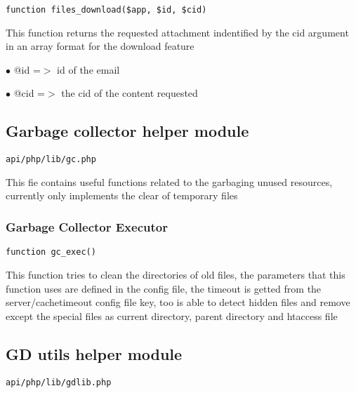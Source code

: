 \documentclass[a4paper]{article}
\begin{document}
\begin{lstlisting}
function files_download($app, $id, $cid)
\end{lstlisting}

This function returns the requested attachment indentified by the cid argument
in an array format for the download feature

\begin{compactitem}
\item[\color{myblue}$\bullet$] @id  =$>$ id of the email
\item[\color{myblue}$\bullet$] @cid =$>$ the cid of the content requested
\end{compactitem}

\hypertarget{toc451}{}
\subsection{Garbage collector helper module}

\begin{lstlisting}
api/php/lib/gc.php
\end{lstlisting}

This fie contains useful functions related to the garbaging unused resources, currently only
implements the clear of temporary files

\hypertarget{toc452}{}
\subsubsection{Garbage Collector Executor}

\begin{lstlisting}
function gc_exec()
\end{lstlisting}

This function tries to clean the directories of old files, the parameters
that this function uses are defined in the config file, the timeout is
getted from the server/cachetimeout config file key, too is able to detect
hidden files and remove except the special files as current directory,
parent directory and htaccess file

\hypertarget{toc453}{}
\subsection{GD utils helper module}

\begin{lstlisting}
api/php/lib/gdlib.php
\end{lstlisting}
\end{document}
